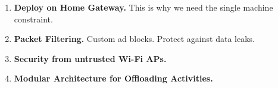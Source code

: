\begin{enumerate}

\item \textbf{Deploy on Home Gateway.}
This is why we need the single machine constraint. 

\item \textbf{Packet Filtering.}
Custom ad blocks. Protect against data leaks. 

\item \textbf{Security from untrusted Wi-Fi APs.}

\item \textbf{Modular Architecture for Offloading Activities.}

\end{enumerate}

